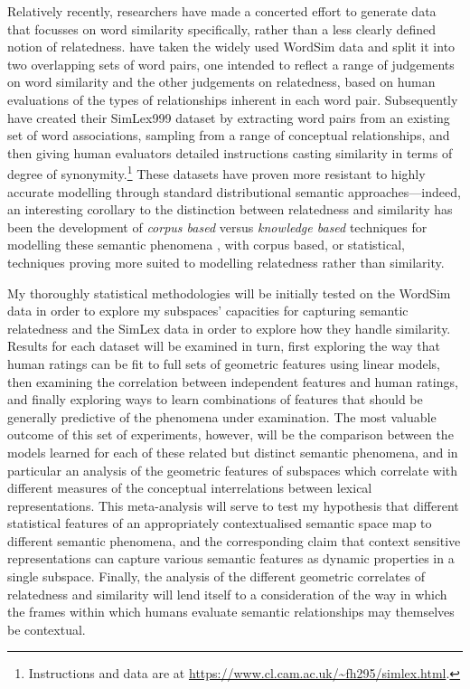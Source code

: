 Relatively recently, researchers have made a concerted effort to generate data that focusses on word similarity specifically, rather than a less clearly defined notion of relatedness.  \cite{AgirreEA2009} have taken the widely used WordSim data and split it into two overlapping sets of word pairs, one intended to reflect a range of judgements on word similarity and the other judgements on relatedness, based on human evaluations of the types of relationships inherent in each word pair.  Subsequently \cite{HillEA2015} have created their SimLex999 dataset by extracting word pairs from an existing set of word associations, sampling from a range of conceptual relationships, and then giving human evaluators detailed instructions casting similarity in terms of degree of synonymity.\footnote{Instructions and data are at \url{https://www.cl.cam.ac.uk/~fh295/simlex.html}.}  These datasets have proven more resistant to highly accurate modelling through standard distributional semantic approaches---indeed, an interesting corollary to the distinction between relatedness and similarity has been the development of \emph{corpus based} versus \emph{knowledge based} techniques for modelling these semantic phenomena \citep[see][for a discussion]{MihalceaEA2006,HassanEA2011}, with corpus based, or statistical, techniques proving more suited to modelling relatedness rather than similarity.

My thoroughly statistical methodologies will be initially tested on the WordSim data in order to explore my subspaces' capacities for capturing semantic relatedness and the SimLex data in order to explore how they handle similarity.  Results for each dataset will be examined in turn, first exploring the way that human ratings can be fit to full sets of geometric features using linear models, then examining the correlation between independent features and human ratings, and finally exploring ways to learn combinations of features that should be generally predictive of the phenomena under examination.  The most valuable outcome of this set of experiments, however, will be the comparison between the models learned for each of these related but distinct semantic phenomena, and in particular an analysis of the geometric features of subspaces which correlate with different measures of the conceptual interrelations between lexical representations.  This meta-analysis will serve to test my hypothesis that different statistical features of an appropriately contextualised semantic space map to different semantic phenomena, and the corresponding claim that context sensitive representations can capture various semantic features as dynamic properties in a single subspace.  Finally, the analysis of the different geometric correlates of relatedness and similarity will lend itself to a consideration of the way in which the frames within which humans evaluate semantic relationships may themselves be contextual.

